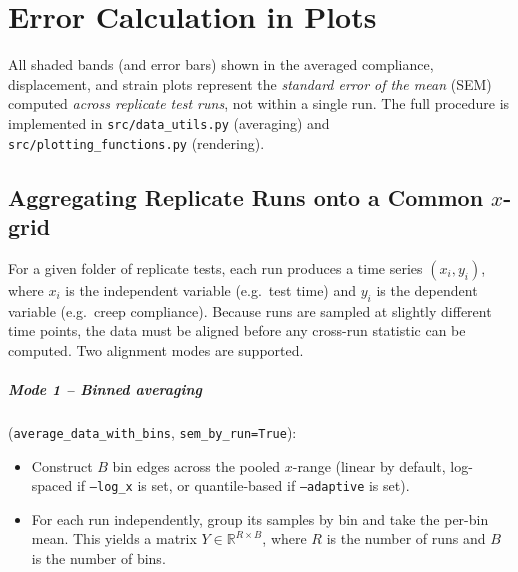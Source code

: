 %

\chapter{Error Calculation in Plots}
\label{app:error-calculation}

All shaded bands (and error bars) shown in the averaged compliance, displacement,
and strain plots represent the \emph{standard error of the mean} (SEM) computed
\emph{across replicate test runs}, not within a single run. The full procedure
is implemented in \texttt{src/data\_utils.py} (averaging) and
\texttt{src/plotting\_functions.py} (rendering).

\section{Aggregating Replicate Runs onto a Common $x$-grid}
\label{sec:err-align}

For a given folder of replicate tests, each run produces a time series
$(x_i, y_i)$, where $x_i$ is the independent variable (e.g.\ test time) and
$y_i$ is the dependent variable (e.g.\ creep compliance). Because runs are
sampled at slightly different time points, the data must be aligned before any
cross-run statistic can be computed. Two alignment modes are supported.

\paragraph{Mode 1 -- Binned averaging}
(\texttt{average\_data\_with\_bins}, \texttt{sem\_by\_run=True}):
\begin{itemize}
  \item Construct $B$ bin edges across the pooled $x$-range
        (linear by default, log-spaced if \texttt{--log\_x} is set, or
        quantile-based if \texttt{--adaptive} is set).
  \item For each run independently, group its samples by bin and take the
        per-bin mean. This yields a matrix
        $Y \in \mathbb{R}^{R \times B}$, where $R$ is the number of runs and
        $B$ is the number of bins.
\end{itemize}

